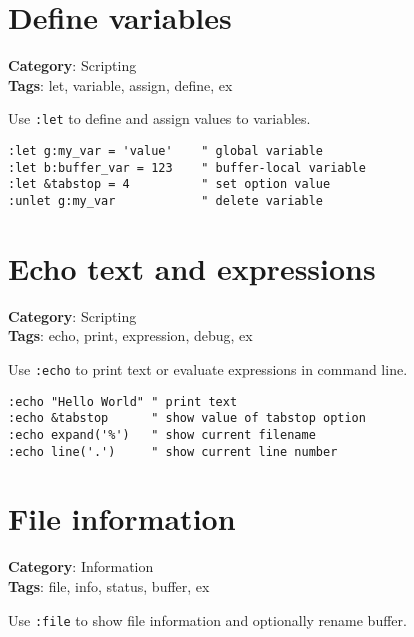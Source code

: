 {{{{{\section{Define variables}

\textbf{Category}: Scripting\\ \textbf{Tags}: let, variable, assign, define, ex
\vspace{0.5cm}

Use {\footnotesize \Verb§:let§} to define and assign values to variables.

\begin{Exa*}{}
\begin{Verbatim}[fontsize=\footnotesize, breaklines, breakanywhere]
:let g:my_var = 'value'    " global variable
:let b:buffer_var = 123    " buffer-local variable
:let &tabstop = 4          " set option value
:unlet g:my_var            " delete variable
\end{Verbatim}
\end{Exa*}

\section{Echo text and expressions}

\textbf{Category}: Scripting\\ \textbf{Tags}: echo, print, expression, debug, ex
\vspace{0.5cm}

Use {\footnotesize \Verb§:echo§} to print text or evaluate expressions in command line.

\begin{Exa*}{}
\begin{Verbatim}[fontsize=\footnotesize, breaklines, breakanywhere]
:echo "Hello World" " print text
:echo &tabstop      " show value of tabstop option
:echo expand('%')   " show current filename
:echo line('.')     " show current line number
\end{Verbatim}
\end{Exa*}

\section{File information}

\textbf{Category}: Information\\ \textbf{Tags}: file, info, status, buffer, ex
\vspace{0.5cm}

Use {\footnotesize \Verb§:file§} to show file information and optionally rename buffer.

}}}}}
